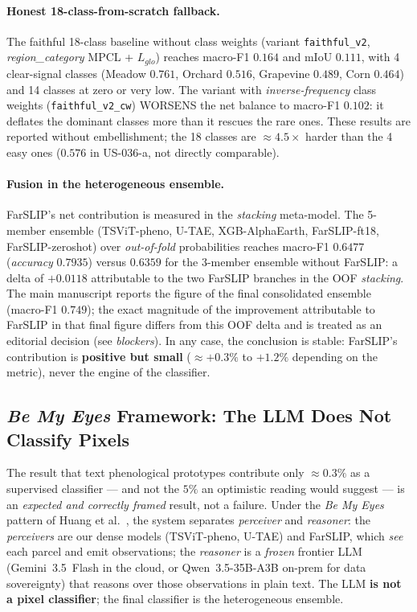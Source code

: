 \paragraph{Honest 18-class-from-scratch fallback.}
The faithful 18-class baseline without class weights (variant
\texttt{faithful\_v2}, \textit{region\_category} MPCL + $L_{glo}$) reaches
macro-F1 $0.164$ and mIoU $0.111$, with 4 clear-signal classes
(Meadow $0.761$, Orchard $0.516$, Grapevine $0.489$, Corn $0.464$) and 14 classes
at zero or very low. The variant with \textit{inverse-frequency} class weights
(\texttt{faithful\_v2\_cw}) WORSENS the net balance to macro-F1 $0.102$: it
deflates the dominant classes more than it rescues the rare ones. These results
are reported without embellishment; the 18 classes are $\approx4.5\times$ harder
than the 4 easy ones ($0.576$ in US-036-a, not directly comparable).

\paragraph{Fusion in the heterogeneous ensemble.}
FarSLIP's net contribution is measured in the \textit{stacking} meta-model. The
5-member ensemble (TSViT-pheno, U-TAE, XGB-AlphaEarth, FarSLIP-ft18,
FarSLIP-zeroshot) over \textit{out-of-fold} probabilities reaches macro-F1
$0.6477$ (\textit{accuracy} $0.7935$) versus $0.6359$ for the 3-member ensemble
without FarSLIP: a delta of $+0.0118$ attributable to the two FarSLIP branches in
the OOF \textit{stacking}. The main manuscript reports the figure of the final
consolidated ensemble (macro-F1 $0.749$); the exact magnitude of the improvement
attributable to FarSLIP in that final figure differs from this OOF delta and is
treated as an editorial decision (see \textit{blockers}). In any case, the
conclusion is stable: FarSLIP's contribution is \textbf{positive but small}
($\approx+0.3\%$ to $+1.2\%$ depending on the metric), never the engine of the
classifier.

\subsection{\textit{Be My Eyes} Framework: The LLM Does Not Classify Pixels}
\label{sec:farslip_bemyeyes}

The result that text phenological prototypes contribute only $\approx0.3\%$ as a
supervised classifier --- and not the $5\%$ an optimistic reading would suggest
--- is an \textit{expected and correctly framed} result, not a failure. Under the
\textit{Be My Eyes} pattern of Huang et al.~\cite{huang2025bemyeyes}, the system
separates \textit{perceiver} and \textit{reasoner}: the \textit{perceivers} are
our dense models (TSViT-pheno, U-TAE) and FarSLIP, which \textit{see} each parcel
and emit observations; the \textit{reasoner} is a \textit{frozen} frontier LLM
(Gemini~3.5~Flash in the cloud, or Qwen~3.5-35B-A3B on-prem for data sovereignty)
that reasons over those observations in plain text. The LLM \textbf{is not a
pixel classifier}; the final classifier is the heterogeneous ensemble.

